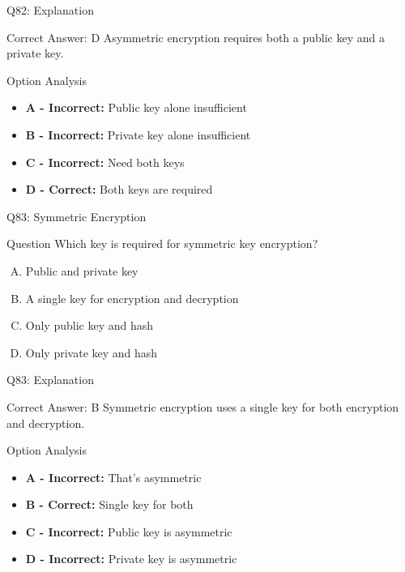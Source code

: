 \documentclass{beamer}
\begin{document}
	\begin{frame}{Q82: Explanation}
		\begin{block}{Correct Answer: D}
			Asymmetric encryption requires both a public key and a private key.
		\end{block}
		\begin{block}{Option Analysis}
			\begin{itemize}
				\item \textbf{A - Incorrect:} Public key alone insufficient
				\item \textbf{B - Incorrect:} Private key alone insufficient
				\item \textbf{C - Incorrect:} Need both keys
				\item \textbf{D - Correct:} Both keys are required
			\end{itemize}
		\end{block}
	\end{frame}
	
	\begin{frame}{Q83: Symmetric Encryption}
		\begin{block}{Question}
			Which key is required for symmetric key encryption?
		\end{block}
		\begin{enumerate}[(A)]
			\item Public and private key
			\item A single key for encryption and decryption
			\item Only public key and hash
			\item Only private key and hash
		\end{enumerate}
	\end{frame}
	
	\begin{frame}{Q83: Explanation}
		\begin{block}{Correct Answer: B}
			Symmetric encryption uses a single key for both encryption and decryption.
		\end{block}
		\begin{block}{Option Analysis}
			\begin{itemize}
				\item \textbf{A - Incorrect:} That's asymmetric
				\item \textbf{B - Correct:} Single key for both
				\item \textbf{C - Incorrect:} Public key is asymmetric
				\item \textbf{D - Incorrect:} Private key is asymmetric
			\end{itemize}
		\end{block}
	\end{frame}
	
\end{document}
